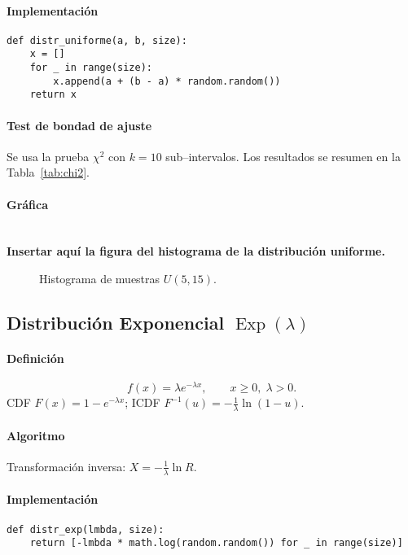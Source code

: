 \documentclass[11pt,a4paper]{article}
\begin{document}
\paragraph{Implementación}
\begin{lstlisting}[caption={Generador de la distribución uniforme},label={lst:uni}]
def distr_uniforme(a, b, size):
    x = []
    for _ in range(size):
        x.append(a + (b - a) * random.random())
    return x
\end{lstlisting}

\paragraph{Test de bondad de ajuste}
Se usa la prueba $\chi^{2}$ con $k=10$ sub–intervalos.
Los resultados se resumen en la Tabla~\ref{tab:chi2}.

\paragraph{Gráfica}\\
\textbf{Insertar aquí la figura del histograma de la distribución uniforme.}
\begin{figure}[H]
    \centering
    \caption{Histograma de muestras $U(5,15)$.}
    \label{fig:uni_hist}
\end{figure}

\subsection{Distribución Exponencial $\operatorname{Exp}(\lambda)$}
\paragraph{Definición}
\[
f(x)=\lambda e^{-\lambda x}, \qquad x\ge 0,\; \lambda>0 .
\]
CDF $F(x)=1-e^{-\lambda x}$; ICDF $F^{-1}(u)=-\frac{1}{\lambda}\ln(1-u)$.

\paragraph{Algoritmo}
Transformación inversa: $X = -\frac{1}{\lambda}\ln R$.

\paragraph{Implementación}
\begin{lstlisting}[caption={Generador exponencial},label={lst:exp}]
def distr_exp(lmbda, size):
    return [-lmbda * math.log(random.random()) for _ in range(size)]
\end{lstlisting}
\end{document}
